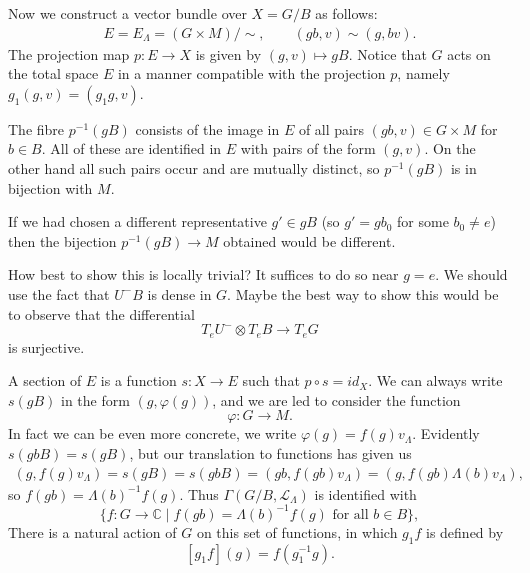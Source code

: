 \documentclass[12pt]{article}
\theoremstyle{plain}
\theoremstyle{definition}
\numberwithin{equation}{section}
\newcommand{\La}{\Lambda}
\newcommand{\C}{\mathbb{C}}
\newcommand{\sll}{\mathfrak{sl}}
\newcommand{\CL}{\mathcal{L}}
\begin{document}
%
%


Now we construct a vector bundle over $X = G / B$ as follows:
\begin{align*}
E = E_\La = (G \times M)/\sim, \qquad (g b, v) \sim (g, b v).
\end{align*}
The projection map $p : E \rightarrow X$ is given by $(g, v) \mapsto gB$. Notice that $G$ acts on the total space $E$ in a manner compatible with the projection $p$, namely $g_1(g, v) = (g_1g, v)$.

The fibre $p^{-1}(gB)$ consists of the image in $E$ of all pairs $(gb, v) \in G \times M$ for $b \in B$. All of these are identified in $E$ with pairs of the form $(g, v)$. On the other hand all such pairs occur and are mutually distinct, so $p^{-1}(gB)$ is in bijection with $M$.

If we had chosen a different representative $g' \in gB$ (so $g' = gb_0$ for some $b_0 \neq e$) then the bijection $p^{-1}(gB) \rightarrow M$ obtained would be different.



{\color{red}
How best to show this is locally trivial? It suffices to do so near $g = e$. We should use the fact that $U^- B$ is dense in $G$. Maybe the best way to show this would be to observe that the differential
\[
T_e U^- \otimes T_e B \rightarrow T_e G
\]
is surjective.
}

A section of $E$ is a function $s : X \rightarrow E$ such that $p \circ s = id_X$. We can always write $s(gB)$ in the form $(g, \varphi(g))$, and we are led to consider the function
\[
\varphi : G \rightarrow M.
\]
In fact we can be even more concrete, we write $\varphi(g) = f(g)v_\La$. Evidently $s(gbB) = s(gB)$, but our translation to functions has given us
\begin{align*}
(g, f(g) v_\La) = s(gB) = s(gbB) = (gb, f(gb) v_\La) = (g, f(gb) \La(b) v_\La),
\end{align*}
so $f(gb) = \Lambda(b)^{-1} f(g)$. Thus $\Gamma(G/B, \CL_\Lambda)$ is identified with
\[
\{f : G \rightarrow \C \mid \text{$f(gb) = \Lambda(b)^{-1} f(g)$ for all $b \in B$}\},
\]
There is a natural action of $G$ on this set of functions, in which $g_1f$ is defined by
\[
[g_1f](g) = f(g_1^{-1}g).
\]
\end{document}
